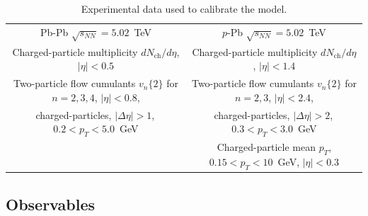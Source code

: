 \documentclass[aps,prc,reprint,amsmath,nofootinbib]{revtex4-1}
\newcommand{\sqrts}{\sqrt{s_{NN}}}
\newcommand{\nch}{N_\text{ch}}
\newcommand{\vnk}[2]{v_#1\{#2\}}
\newcommand{\paddedhline}{\noalign{\smallskip}\hline\noalign{\smallskip}}
\begin{document}
\begin{table}
  \caption{
    \label{tab:observables}
    Experimental data used to calibrate the model.
  }
  \begin{ruledtabular}
  \begin{tabular}{cc}
    Pb-Pb $\sqrts=5.02$~TeV & $p$-Pb $\sqrts=5.02$~TeV \\
    \paddedhline
    Charged-particle multiplicity $d\nch/d\eta$, $|\eta| < 0.5$ \cite{Adam:2015ptt} & Charged-particle multiplicity $d\nch/d\eta$, $|\eta| < 1.4$ \cite{Adam:2014qja} \\
    \noalign{\smallskip}
  Two-particle flow cumulants  $\vnk{n}{2}$ for $n=2,3,4$, $|\eta| < 0.8$,  & Two-particle flow cumulants $\vnk{n}{2}$ for $n=2,3$, $|\eta| < 2.4$, \\
    charged-particles, $|\Delta\eta| > 1$,\, $0.2 < p_T < 5.0$~GeV \cite{Adam:2016izf} & charged-particles, $|\Delta\eta| > 2$,\, $0.3 < p_T < 3.0$~GeV \cite{Chatrchyan:2013nka}\\
    \noalign{\smallskip}
    & Charged-particle mean $p_T$, $0.15 < p_T < 10$~GeV, $|\eta| < 0.3$ \cite{Abelev:2013bla}\\
  \end{tabular}
  \end{ruledtabular}
\end{table}

\subsection{Observables}
\label{sec:observables}
\end{document}
